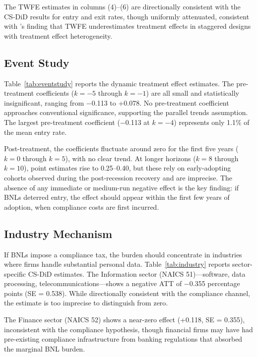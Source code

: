 \documentclass[12pt]{article}
\begin{document}
The TWFE estimates in columns (4)--(6) are directionally consistent with the CS-DiD results for entry and exit rates, though uniformly attenuated, consistent with \citet{goodmanbacon2021difference}'s finding that TWFE underestimates treatment effects in staggered designs with treatment effect heterogeneity.

\subsection{Event Study}



Table~\ref{tab:eventstudy} reports the dynamic treatment effect estimates. The pre-treatment coefficients ($k = -5$ through $k = -1$) are all small and statistically insignificant, ranging from $-$0.113 to +0.078. No pre-treatment coefficient approaches conventional significance, supporting the parallel trends assumption. The largest pre-treatment coefficient ($-$0.113 at $k = -4$) represents only 1.1\% of the mean entry rate.

Post-treatment, the coefficients fluctuate around zero for the first five years ($k = 0$ through $k = 5$), with no clear trend. At longer horizons ($k = 8$ through $k = 10$), point estimates rise to 0.25--0.40, but these rely on early-adopting cohorts observed during the post-recession recovery and are imprecise. The absence of any immediate or medium-run negative effect is the key finding: if BNLs deterred entry, the effect should appear within the first few years of adoption, when compliance costs are first incurred.


\subsection{Industry Mechanism}



If BNLs impose a compliance tax, the burden should concentrate in industries where firms handle substantial personal data. Table~\ref{tab:industry} reports sector-specific CS-DiD estimates. The Information sector (NAICS 51)---software, data processing, telecommunications---shows a negative ATT of $-$0.355 percentage points (SE = 0.538). While directionally consistent with the compliance channel, the estimate is too imprecise to distinguish from zero.

The Finance sector (NAICS 52) shows a near-zero effect (+0.118, SE = 0.355), inconsistent with the compliance hypothesis, though financial firms may have had pre-existing compliance infrastructure from banking regulations that absorbed the marginal BNL burden.
\end{document}
